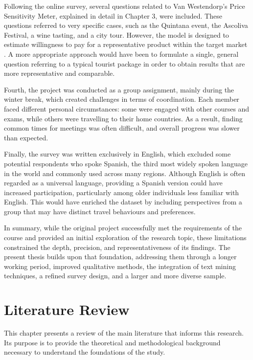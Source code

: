 \documentclass[a4paper, 12pt, twoside]{report}  %
\begin{document}
\indent Following the online survey, several questions related to Van Westendorp’s Price Sensitivity Meter, explained in detail in Chapter 3, were included. These questions referred to very specific cases, such as the Quintana event, the Ascoliva Festival, a wine tasting, and a city tour. However, the model is designed to estimate willingness to pay for a representative product within the target market \cite{vw_model}. A more appropriate approach would have been to formulate a single, general question referring to a typical tourist package in order to obtain results that are more representative and comparable.

\indent Fourth, the project was conducted as a group assignment, mainly during the winter break, which created challenges in terms of coordination. Each member faced different personal circumstances: some were engaged with other courses and exams, while others were travelling to their home countries. As a result, finding common times for meetings was often difficult, and overall progress was slower than expected.

\indent Finally, the survey was written exclusively in English, which excluded some potential respondents who spoke Spanish, the third most widely spoken language in the world and commonly used across many regions. Although English is often regarded as a universal language, providing a Spanish version could have increased participation, particularly among older individuals less familiar with English. This would have enriched the dataset by including perspectives from a group that may have distinct travel behaviours and preferences.

\indent In summary, while the original project successfully met the requirements of the course and provided an initial exploration of the research topic, these limitations constrained the depth, precision, and representativeness of its findings. The present thesis builds upon that foundation, addressing them through a longer working period, improved qualitative methods, the integration of text mining techniques, a refined survey design, and a larger and more diverse sample.


\chapter{Literature Review}

\indent This chapter presents a review of the main literature that informs this research. Its purpose is to provide the theoretical and methodological background necessary to understand the foundations of the study.
\end{document}
